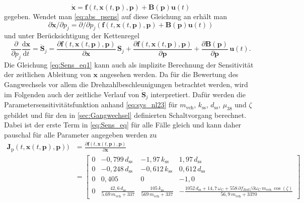 \begin{equation}
\dot{\pmb{x}} = \pmb{f}(t,\pmb{x}(t,\pmb{p}),\pmb{p})+ \pmb{B}(\pmb{p})\pmb{u}(t) 
\end{equation} 
gegeben. Wendet man \eqref{eq:abs_psens} auf diese Gleichung an erhält man
\begin{equation}\label{eq:Sens_eq1}
\partial\dot{\pmb{x}}/\partial p_j = \partial/\partial p_j\left(\pmb{f}(t,\pmb{x}(t,\pmb{p}),\pmb{p})+ \pmb{B}(\pmb{p})\pmb{u}(t)\right)
\end{equation}
und unter Berücksichtigung der Kettenregel
\begin{equation}\label{eq:Sens_eq}
\frac{\partial}{\partial p_j}\frac{\mathrm{d} \pmb{x}}{\mathrm{d} t} = \dot{\pmb{S}}_j= \frac{\partial\pmb{f}(t,\pmb{x}(t,\pmb{p}),\pmb{p})}{\partial \pmb{x}}\,\pmb{S}_j+\frac{\partial\pmb{f}(t,\pmb{x}(t,\pmb{p}),\pmb{p})}{\partial \pmb{p}}+\frac{\partial \pmb{B}(\pmb{p})}{\partial \pmb{p}}\,\pmb{u}(t).
\end{equation}
Die Gleichung \eqref{eq:Sens_eq1} kann auch als implizite Berechnung der Sensitivität der zeitlichen Ableitung von $\pmb{x}$ angesehen werden. Da für die Bewertung des Gangwechsels vor allem die Drehzahlbeschleunigungen betrachtet werden, wird im Folgenden auch der zeitliche Verlauf von $\dot{\pmb{S}}_j$ interpretiert. Dafür werden die Parametersensitivitätsfunktion anhand \eqref{eq:sys_nl23} für $m_\mathrm{veh}$, $k_\mathrm{ss}$, $d_\mathrm{ss}$, $\mu_{38}$ und $\zeta$ gebildet und für den in \ref{sec:Gangwechsel} definierten Schaltvorgang berechnet. Dabei ist der erste Term in \eqref{eq:Sens_eq} für alle Fälle gleich und kann daher pauschal für alle Parameter angegeben werden zu
\begin{equation}
\begin{split}
\pmb{J}_\mathrm{p}(t,\pmb{x}(t,\pmb{p}),\pmb{p})) &= \frac{\partial\pmb{f}(t,\pmb{x}(t,\pmb{p}),\pmb{p})}{\partial \pmb{x}}\\
 &= \begin{bmatrix} 0 & -0,799\,d_\mathrm{ss} & -1,97\,k_\mathrm{ss} & 1,97\,d_\mathrm{ss} \\  0 & -0,248\,d_\mathrm{ss} & -0,612\,k_\mathrm{ss} & 0,612\,d_\mathrm{ss} \\0 & 0,405 & 0 & -1,0 \\ 0 & \frac{42,6\,d_\mathrm{ss}}{5.69\,m_\mathrm{veh} + 337} & \frac{105\,k_\mathrm{ss}}{569\,m_\mathrm{veh}+337} & -\frac{1052\,d_\mathrm{ss} + 14,7\,\omega_\mathrm{C} + 558\,\partial f_{Roll}/\partial \omega_\mathrm{C}\,m_\mathrm{veh}\,\cos(\zeta)}{56,9\,m_\mathrm{veh} + 3370}\end{bmatrix}
\end{split}
\end{equation}

